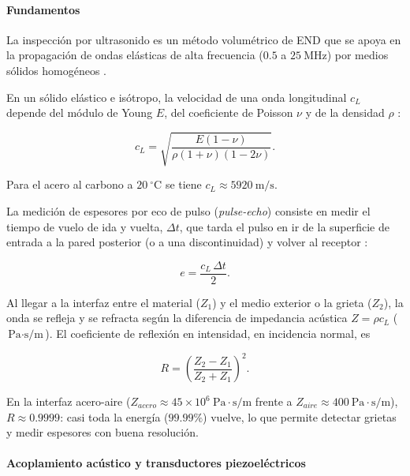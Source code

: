 \paragraph{Fundamentos}

La inspección por ultrasonido es un método volumétrico de END que se apoya en la
propagación de ondas elásticas de alta frecuencia ($0.5$ a $25\ \text{MHz}$) por
medios sólidos homogéneos \parencite{krautkramer1990, iso16810}.

En un sólido elástico e isótropo, la velocidad de una onda longitudinal $c_L$ depende
del módulo de Young $E$, del coeficiente de Poisson $\nu$ y de la densidad $\rho$
\parencite{cheeke2017}:

\begin{equation}
  c_L = \sqrt{\frac{E(1-\nu)}{\rho(1+\nu)(1-2\nu)}}.
  \label{eq:velocidad-longitudinal}
\end{equation}

Para el acero al carbono a $20\ ^\circ\text{C}$ se tiene $c_L \approx
5920\ \text{m/s}$.

La medición de espesores por eco de pulso (\textit{pulse-echo}) consiste en medir el
tiempo de vuelo de ida y vuelta, $\Delta t$, que tarda el pulso en ir de la superficie
de entrada a la pared posterior (o a una discontinuidad) y volver al receptor
\parencite{astm_e797}:

\begin{equation}
  e = \frac{c_L\,\Delta t}{2}.
  \label{eq:espesor-tof}
\end{equation}

Al llegar a la interfaz entre el material ($Z_1$) y el medio exterior o la grieta
($Z_2$), la onda se refleja y se refracta según la diferencia de impedancia acústica
$Z = \rho c_L$ ($\text{Pa}\cdot\text{s/m}$). El coeficiente de reflexión en
intensidad, en incidencia normal, es \parencite{krautkramer1990}

\begin{equation}
  R = \left(\frac{Z_2 - Z_1}{Z_2 + Z_1}\right)^2.
  \label{eq:coeficiente-reflexion}
\end{equation}

En la interfaz acero-aire ($Z_{acero}\approx 45\times10^6\ \text{Pa}\cdot\text{s/m}$
frente a $Z_{aire}\approx 400\ \text{Pa}\cdot\text{s/m}$), $R\approx 0.9999$: casi
toda la energía ($99.99\%$) vuelve, lo que permite detectar grietas y medir
espesores con buena resolución.

\paragraph{Acoplamiento acústico y transductores piezoeléctricos}


